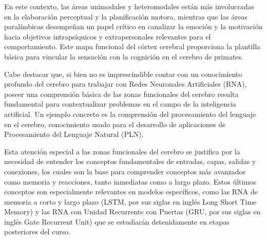 En este contexto, las áreas unimodales y heteromodales están más involucradas en la elaboración perceptual y la planificación motora, mientras que las áreas paralímbicas desempeñan un papel crítico en canalizar la emoción y la motivación hacia objetivos intrapsíquicos y extrapersonales relevantes para el comportamiento. Este mapa funcional del córtex cerebral proporciona la plantilla básica para vincular la sensación con la cognición en el cerebro de primates.

Cabe destacar que, si bien no es imprescindible contar con un conocimiento profundo del cerebro para trabajar con Redes Neuronales Artificiales (RNA), poseer una comprensión básica de las zonas funcionales del cerebro resulta fundamental para contextualizar problemas en el campo de la inteligencia artificial. Un ejemplo concreto es la comprensión del procesamiento del lenguaje en el cerebro, conocimiento usado para el desarrollo de aplicaciones de Procesamiento del Lenguaje Natural (PLN).

Esta atención especial a las zonas funcionales del cerebro se justifica por la necesidad de entender los conceptos fundamentales de entradas, capas, salidas y conexiones, los cuales son la base para comprender conceptos más avanzados como memoria y reacciones, tanto inmediatas como a largo plazo. Estos últimos conceptos son especialmente relevantes en modelos específicos, como las RNA de memoria a corto y largo plazo (LSTM, por sus siglas en inglés Long Short Time Memory) y las RNA con Unidad Recurrente con Puertas (GRU, por sus siglas en inglés Gate Recurrent Unit)  que se estudiarán detenidamente en etapas posteriores del curso.







